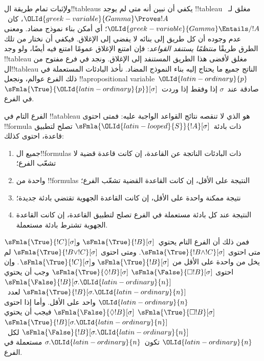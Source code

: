 \documentclass[../../../include/open-logic-section]{subfiles}
\begin{document}


\begin{explain}
  ولإثبات تمام طريقة ال!!{tableau}s يكفي أن نبين أنه متى لم يوجد
  !!{tableau} مغلق لـ~$\OLId{greek-variable}{Gamma} \Proves !A$، كان~$\OLId{greek-variable}{Gamma} \Entails/ !A$؛
  أي أمكن بناء نموذج مضاد. ومعنى عدم وجوده أن كل طريق إلى بنائه لا يفضي
  إلى الإغلاق. فيكفي أن نختار من تلك الطرق طريقًا
  \emph{منتظمًا يستنفد القواعد}: فإن امتنع الإغلاق عمومًا امتنع فيه
  أيضًا، ولو وجد !!{tableau} مغلق لأفضى هذا الطريق المستنفد إلى
  الإغلاق. ونجد في فرع مفتوح من ال!!{tableau} الناتج جميع ما يحتاج إليه
  بناء النموذج المضاد. نأخذ البادئات المستعملة في ذلك الفرع عوالم،
  ونجعل !!a{propositional variable}~$\OLId{latin-ordinary}{p}$ صادقة عند~$\sigma$ إذا وفقط إذا
  وردت~$\sFmla{\True}{\OLId{latin-ordinary}{p}}[\sigma]$ في الفرع.
\end{explain}

\begin{defn}
  الفرع التام في !!a{tableau} هو الذي لا تنقصه نتائج القواعد الواجبة
  عليه: فمتى احتوى !!{formula} ذات بادئة~$\sFmla{\OLId{latin-looped}{S}}{!A}[\sigma]$
  تصلح لتطبيق قاعدة، احتوى كذلك:
  \begin{enumerate}
    \item جميع ال!!{formula}s ذات البادئات الناتجة عن القاعدة، إن
      كانت قاعدة قضية لا تشعّب الفرع؛
    \item واحدة من !!{formula}s النتيجة على الأقل، إن كانت القاعدة
      القضية تشعّب الفرع؛
    \item نتيجة ممكنة واحدة على الأقل، إن كانت القاعدة الجهوية
      تقتضي بادئة جديدة؛
    \item النتيجة عند كل بادئة مستعملة في الفرع تصلح لتطبيق القاعدة،
      إن كانت القاعدة الجهوية تشترط بادئة مستعملة.
  \end{enumerate}
\end{defn}

\begin{explain}
فمن ذلك أن الفرع التام يحتوي~$\sFmla{\True}{!B}[\sigma]$
و$\sFmla{\True}{!C}[\sigma]$ متى احتوى
$\sFmla{\True}{!B \land !C}[\sigma]$. ومتى احتوى
$\sFmla{\True}{!B \lor !C}[\sigma]$ لم يخل من واحدة على الأقل من
$\sFmla{\True}{!B}[\sigma]$ و$\sFmla{\True}{!C}[\sigma]$.
وإن احتوى
 {$\sFmla{\False}{\Box !B}[\sigma]$}
{$\sFmla{\True}{\Diamond !B}[\sigma]$} وجب أن يحتوي
 {$\sFmla{\False}{!B}[\sigma.\OLId{latin-ordinary}{n}]$}
{$\sFmla{\True}{!B}[\sigma.\OLId{latin-ordinary}{n}]$} لعدد~$\OLId{latin-ordinary}{n}$ واحد على الأقل.
وأما إذا احتوى
 {$\sFmla{\True}{\Box !B}[\sigma]$}
{$\sFmla{\False}{\Diamond !B}[\sigma]$} فيجب أن يحتوي
 {$\sFmla{\True}{!B}[\sigma.\OLId{latin-ordinary}{n}]$}
{$\sFmla{\False}{!B}[\sigma.\OLId{latin-ordinary}{n}]$} لكل~$\OLId{latin-ordinary}{n}$ تكون~$\sigma.\OLId{latin-ordinary}{n}$
مستعملة في الفرع.
\end{explain}
\end{document}
